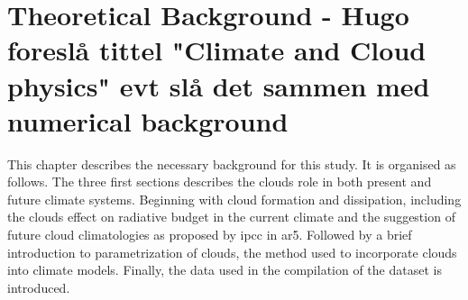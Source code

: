 \setcounter{chapter}{1} 
\chapter{Theoretical Background - Hugo foreslå tittel "Climate and Cloud physics" evt slå det sammen med numerical background} \label{ch:theoretical_back}
This chapter describes the necessary background for this study. It is organised as follows. The three first sections describes  the clouds role in both present and future climate systems. Beginning with cloud formation and dissipation, including the clouds effect on radiative budget in the current climate and the suggestion of future cloud climatologies as proposed by \acrshort{ipcc} in \acrshort{ar5}. Followed by a brief introduction to parametrization of clouds, the method used to incorporate clouds into climate models.
Finally, the data used in the compilation of the dataset is introduced. 


%




